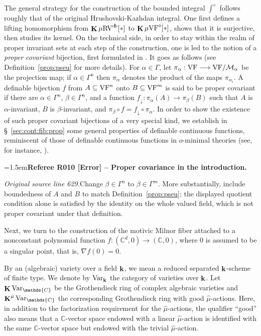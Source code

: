 \documentclass[12pt]{amsart}
\newcommand{\RefereeRemark}[4]{%
  \par\medskip\begingroup\normalfont\small\color{RefereePurple}%
  \emergencystretch=1.5em\noindent\textbf{Referee R#1 [#2] -- #3.}\par\nobreak\noindent #4\par
  \endgroup\medskip
}
\newcommand{\memph}[1]{{\color{magenta}\emph{#1}}}
\theoremstyle{plain}
\theoremstyle{definition}
\theoremstyle{remark}
\numberwithin{equation}{section}
\theoremstyle{plain}
\newcommand{\VF}{\textup{VF}}
\newcommand{\RV}{\textup{RV}}
\newcommand{\MM}{\mdl M}
\newcommand{\C}{\mathds{C}}
\newcommand{\omin}{$o$\nobreakdash}
\newcommand{\0}{\emptyset}
\newcommand{\mdl}[1]{\mathcal{#1}}  %
\newcommand{\fun}{\longrightarrow}
\newcommand{\sub}{\subseteq}
\newcommand{\mgVF}{{\mu} {\VF}}
\newcommand{\mgRV}{{\mu}{\RV}}
\DeclareMathOperator{\ggk}{\mathbf{K}}
\DeclareMathOperator{\db}{d \! b}
\newcommand{\var}{\textup{Var}}
\DeclareMathOperator{\bfk}{\bf k}
\newcommand{\Var}{\textup{Var}}
\begin{document}
The general strategy for the construction of the bounded integral $\int^\diamond$ follows roughly that of the original Hrushovski-Kazhdan integral. One first defines a lifting homomorphism from $\ggk  \mgRV^{\db}[*]$ to $\ggk \mgVF^\diamond[*]$,  shows that it is surjective, then studies its kernel.
On the technical side, in order to stay within the realm of proper invariant sets at each step of the construction, one is led to the notion of a \memph{proper covariant} bijection, first formulated in \cite{hru:loe:lef}. It goes as follows (see Definition~\ref{prop:pseu} for more details). For $\alpha \in \Gamma$, let $\pi_\alpha : \VF\fun \VF/\MM_\alpha$ be the projection map;  if $\alpha\in \Gamma^n$ then $\pi_{\alpha}$ denotes the product of the maps $\pi_{\alpha_i}$. A definable bijection $f$ from $A\sub \VF^n$ onto  $B \sub \VF^m$ is said to be proper covariant if there are $\alpha \in \Gamma^n$, $\beta \in \Gamma^n$, and a function $f_\downarrow : \pi_{\alpha}(A) \fun \pi_{\beta}(B)$ such that $A$ is $\alpha$-invariant, $B$ is $\beta$-invariant, and  $\pi_\beta \circ f = f_\downarrow \circ \pi_\alpha$. In order to show the existence of such proper covariant bijections of a very special kind, we establish in \S~\ref{sec:cont:fib:prop} some general properties of definable continuous functions, reminiscent of those of definable continuous functions in \omin-minimal theories (see, for instance,  \cite[Chapter~6]{dries:1998}).

\RefereeRemark{010}{Error}{Proper covariance in the introduction}{%
\textit{Original source line 629.}\quad Change $\beta\in\Gamma^n$ to $\beta\in\Gamma^m$. More substantially, include boundedness of $A$ and $B$ to match Definition~\ref{prop:pseu}; the displayed quotient condition alone is satisfied by the identity on the whole valued field, which is not proper covariant under that definition.
}

Next, we turn to the construction of the motivic Milnor fiber attached to a nonconstant polynomial function $f : (\C^d, 0) \fun (\C, 0)$,  where $0$ is assumed to be a singular point, that is, $\nabla f (0) = 0$.

By an (algebraic) variety over a field $\bfk$, we mean a reduced separated $\bfk$-scheme of finite type. We denote by $\Var_{\bfk}$ the category of  varieties over $\bfk$.
Let $\ggk \var_{\C}$ be the Grothendieck ring of complex algebraic varieties and $\ggk^{\hat \mu} \var_{\C}$ the corresponding Grothendieck ring with good $\hat \mu$-actions. Here, in addition to the factorization requirement for the $\hat \mu$-actions, the qualifier ``good'' also means that a $\C$-vector space endowed with a linear $\hat \mu$-action is identified with the same  $\C$-vector space but endowed with the trivial $\hat \mu$-action.
\end{document}
